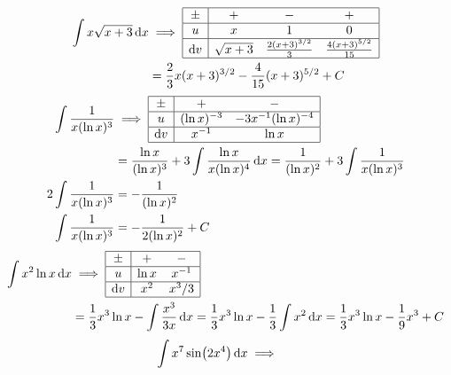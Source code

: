 \documentclass{article}
\begin{document}
\begin{tasks}[style = enumerate]
\begin{align*}
					\end{align*}
				\task
					\begin{align*}
						\int x \sqrt{x + 3} \dd{x} &\implies
								\begin{array}{|c|ccc|}\hline
									\pm & + & - & + \\\hline
									u &	x & 1 & 0\\\hline
									\dd{v} & \sqrt{x + 3} & \frac{2(x + 3)^{3/2}}{3} & \frac{4(x + 3)^{5/2}}{15} \\\hline
								\end{array} \\
							&= \frac{2}{3}x(x + 3)^{3/2} - \frac{4}{15}(x + 3)^{5/2} + C
					\end{align*}
				\task
					\begin{align*}
						\int \frac{1}{x(\ln x)^3} &\implies
								\begin{array}{|c|cc|}\hline
									\pm & + & - \\\hline
									u & (\ln x)^{-3} & -3x^{-1}(\ln x)^{-4} \\\hline
									\dd{v} & x^{-1} & \ln x \\\hline
								\end{array} \\
							&= \frac{\ln x}{(\ln x)^3} + 3\int \frac{\ln x}{x(\ln x)^4} \dd{x}
								= \frac{1}{(\ln x)^2} + 3\int \frac{1}{x(\ln x)^3} \\
						2\int \frac{1}{x(\ln x)^3} &= -\frac{1}{(\ln x)^2} \\
						\int \frac{1}{x(\ln x)^3} &= - \frac{1}{2(\ln x)^2} + C
					\end{align*}
				\task
					\begin{align*}
						\int x^2\ln x \dd{x} &\implies
								\begin{array}{|c|cc|}\hline
									\pm & + & - \\\hline
									u & \ln x & x^{-1} \\\hline
									\dd{v} & x^2 & x^3/3 \\\hline
								\end{array} \\
							&= \frac{1}{3}x^3\ln x - \int \frac{x^3}{3x} \dd{x}
								= \frac{1}{3}x^3\ln x - \frac{1}{3} \int x^2 \dd{x}
								= \frac{1}{3}x^3\ln x - \frac{1}{9}x^3 + C
					\end{align*}
				\task
					\begin{align*}
						\int x^7\sin(2x^4) \dd{x} &\implies
								\begin{array}{|c|cc|}\hline

\end{array}
\end{align*}
\end{tasks}
\end{document}

